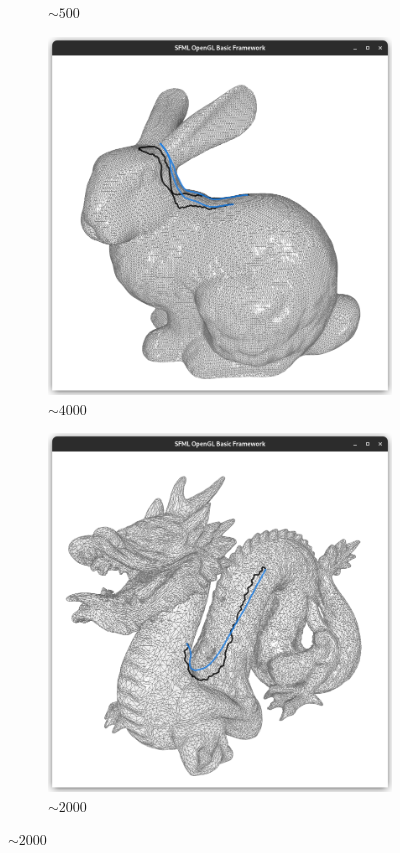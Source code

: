 \documentclass{stdlocal}
\begin{document}
\begin{figure}
\begin{subfigure}[b]{0.24\linewidth}
    \caption{$\sim 500$}
  \end{subfigure}
  \begin{subfigure}[b]{0.24\linewidth}
    \centering
    \includegraphics[width=\linewidth,trim={25px 20 25 50},clip]{images/bunny-geodesic-1.png}
    \caption{$\sim 4000$}
  \end{subfigure}
  \begin{subfigure}[b]{0.24\linewidth}
    \centering
    \includegraphics[width=\linewidth,trim={25px 20 25 50},clip]{images/dragon-geodesic-1.png}
    \caption{$\sim 2000$}
  \end{subfigure}


\end{figure}
\end{document}
